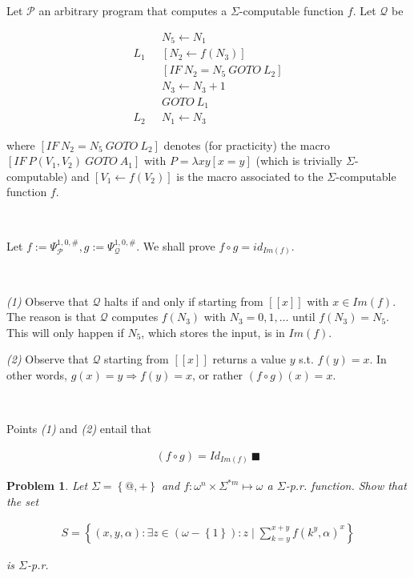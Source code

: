 \documentclass[a4paper, 12pt]{article}
\newtheorem{problem}{Problem}
\newtheorem{problem}{Problem}
\begin{document}
Let $\mathcal{P}$ an arbitrary program that computes a $\Sigma$-computable
function $f$. Let $\mathcal{Q}$ be

\begin{align*}
    &N_{5} \leftarrow N_1 \\ 
    L_1 ~ ~ ~ &[N_2 \leftarrow f(N_3)] \\ 
    &[IF ~ N_2 = N_5 ~ GOTO ~ L_2 ] \\ 
    &N_3 \leftarrow  N_3 + 1 \\ 
    &GOTO ~ L_1 \\ 
    L_2 ~ ~ ~ &N_1 \leftarrow N_3
\end{align*}

where $[IF ~ N_2 = N_5 ~ GOTO ~ L_2] $ denotes (for practicity) the macro $[IF ~
P(V_1, V_2) ~ GOTO ~ A_1]$ with $P = \lambda xy \left[  x = y \right]$ (which is
trivially $\Sigma$-computable) and $[V_1 \leftarrow f(V_2)]$ is the macro
associated to the $\Sigma$-computable function $f$.

~

Let $f := \Psi_{\mathcal{P}}^{1, 0, \#}, g := \Psi_{\mathcal{Q}}^{1, 0, \#}$. We
shall prove $f \circ g = id_{Im(f)}$.

~

\textit{(1)} Observe that $\mathcal{Q}$ halts if and only if starting from $[\![
x ]\!]$ with $x \in Im(f)$. The reason is that $\mathcal{Q}$ computes
$f(N_3)$ with $N_3 = 0, 1, \ldots$ until $f(N_3) = N_5$. This will only happen
if $N_5$, which stores the input, is in $Im(f)$.

\textit{(2)} Observe that $\mathcal{Q}$ starting from $[\![ x ]\!]$ returns a
value $y$ s.t. $f(y) = x$. In other words, $g(x) = y \Rightarrow f(y) = x$, or
rather $(f \circ g)(x) = x$. 

~

Points \textit{(1)} and \textit{(2)} entail that 

\begin{align*}
    (f \circ g) = Id_{Im(f)} ~ \blacksquare
\end{align*}

\pagebreak 

\begin{problem}
    Let $\Sigma = \left\{ @, + \right\} $ and $f : \omega^{n} \times \Sigma^{*m}
    \mapsto \omega$ a $\Sigma$-p.r. function. Show that the set 

    \begin{align*}
        S = \left\{ (x, y, \alpha) : \exists z \in (\omega - \left\{ 1
            \right\})
        : z \mid \sum_{k=y}^{x + y} f(k^y, \alpha)^x \right\} 
    \end{align*}

    is $\Sigma$-p.r. 
\end{problem}
\end{document}
